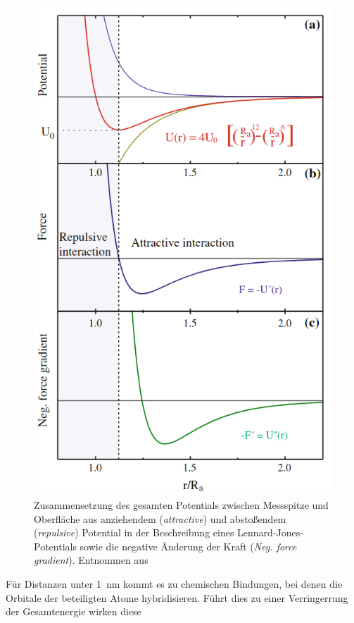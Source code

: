         \begin{figure}
          \includegraphics[scale = 0.42]{pictures/LJ.png}
          \caption{Zusammensetzung des gesamten Potentials zwischen Messspitze und Oberfläche aus anziehendem (\textit{attractive}) und abstoßendem (\textit{repulsive}) Potential in der Beschreibung eines Lennard-Jones-Potentials sowie die negative Änderung der Kraft (\textit{Neg. force gradient}). Entnommen aus \cite{voigtlander_scanning_2015}}
          \label{fig:LJ}
        \end{figure}
        \FloatBarrier
        Für Distanzen unter \SI{1}{\nano\metre} kommt es zu chemischen Bindungen, bei denen die Orbitale der beteiligten Atome hybridisieren. Führt dies zu einer Verringerrung der Gesamtenergie wirken diese 
